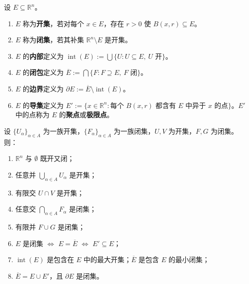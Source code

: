 \begin{definition}[开集与闭集]\label{def:open_closed_set}
设 $E \subseteq \mathbb{R}^n$。
\begin{enumerate}[label=(\roman*)]
    \item $E$ 称为\textbf{开集}，若对每个 $x \in E$，存在 $r > 0$ 使 $B(x, r) \subseteq E$。
    \item $E$ 称为\textbf{闭集}，若其补集 $\mathbb{R}^n \setminus E$ 是开集。
    \item $E$ 的\textbf{内部}定义为 $\operatorname{int}(E) := \bigcup \{U : U \subseteq E,\ U \text{ 开}\}$。
    \item $E$ 的\textbf{闭包}定义为 $\overline{E} := \bigcap \{F : F \supseteq E,\ F \text{ 闭}\}$。
    \item $E$ 的\textbf{边界}定义为 $\partial E := \overline{E} \setminus \operatorname{int}(E)$。
    \item $E$ 的\textbf{导集}定义为 $E' := \{x \in \mathbb{R}^n : \text{每个 } B(x, r) \text{ 都含有 } E \text{ 中异于 } x \text{ 的点}\}$。$E'$ 中的点称为 $E$ 的\textbf{聚点}或\textbf{极限点}。
\end{enumerate}
\end{definition}

\begin{proposition}[开集与闭集的基本性质]\label{prop:open_closed_properties}
设 $\{U_\alpha\}_{\alpha \in A}$ 为一族开集，$\{F_\alpha\}_{\alpha \in A}$ 为一族闭集，$U, V$ 为开集，$F, G$ 为闭集。则：
\begin{enumerate}[label=(\roman*)]
    \item $\mathbb{R}^n$ 与 $\emptyset$ 既开又闭；
    \item 任意并 $\bigcup_{\alpha \in A} U_\alpha$ 是开集；
    \item 有限交 $U \cap V$ 是开集；
    \item 任意交 $\bigcap_{\alpha \in A} F_\alpha$ 是闭集；
    \item 有限并 $F \cup G$ 是闭集；
    \item $E$ 是闭集 $\iff$ $E = \overline{E}$ $\iff$ $E' \subseteq E$；
    \item $\operatorname{int}(E)$ 是包含在 $E$ 中的最大开集；$\overline{E}$ 是包含 $E$ 的最小闭集；
    \item $\overline{E} = E \cup E'$，且 $\partial E$ 是闭集。
\end{enumerate}
\end{proposition}

